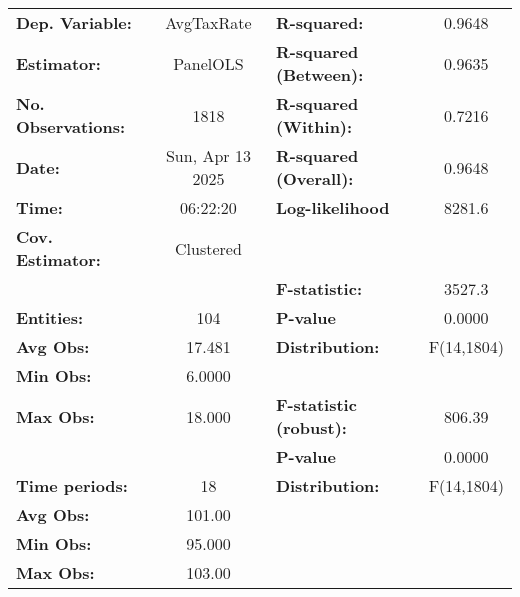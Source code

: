 \begin{center}
\begin{tabular}{lclc}
\toprule
\textbf{Dep. Variable:}                    &     AvgTaxRate     & \textbf{  R-squared:         }   &      0.9648      \\
\textbf{Estimator:}                        &      PanelOLS      & \textbf{  R-squared (Between):}  &      0.9635      \\
\textbf{No. Observations:}                 &        1818        & \textbf{  R-squared (Within):}   &      0.7216      \\
\textbf{Date:}                             &  Sun, Apr 13 2025  & \textbf{  R-squared (Overall):}  &      0.9648      \\
\textbf{Time:}                             &      06:22:20      & \textbf{  Log-likelihood     }   &      8281.6      \\
\textbf{Cov. Estimator:}                   &     Clustered      & \textbf{                     }   &                  \\
\textbf{}                                  &                    & \textbf{  F-statistic:       }   &      3527.3      \\
\textbf{Entities:}                         &        104         & \textbf{  P-value            }   &      0.0000      \\
\textbf{Avg Obs:}                          &       17.481       & \textbf{  Distribution:      }   &    F(14,1804)    \\
\textbf{Min Obs:}                          &       6.0000       & \textbf{                     }   &                  \\
\textbf{Max Obs:}                          &       18.000       & \textbf{  F-statistic (robust):} &      806.39      \\
\textbf{}                                  &                    & \textbf{  P-value            }   &      0.0000      \\
\textbf{Time periods:}                     &         18         & \textbf{  Distribution:      }   &    F(14,1804)    \\
\textbf{Avg Obs:}                          &       101.00       & \textbf{                     }   &                  \\
\textbf{Min Obs:}                          &       95.000       & \textbf{                     }   &                  \\
\textbf{Max Obs:}                          &       103.00       & \textbf{                     }   &                  \\

\end{tabular}
\end{center}
